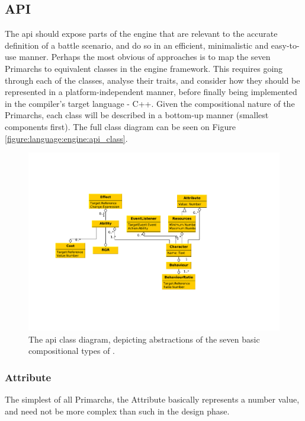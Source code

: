 \subsection*{API}

The \ac{api} should expose parts of the engine that are relevant to the accurate definition of a battle scenario, and do so in an efficient, minimalistic and easy-to-use manner. Perhaps the most obvious of approaches is to map the seven \langname{} Primarchs to equivalent classes in the engine framework. This requires going through each of the classes, analyse their traits, and consider how they should be represented in a platform-independent manner, before finally being implemented in the compiler's target language - C++. Given the compositional nature of the Primarchs, each class will be described in a bottom-up manner (smallest components first). The full class diagram can be seen on Figure \vref{figure:language:engine:api_class}.

\begin{figure}[!h]
\centering
\includegraphics[scale=.6, clip=true, trim=1cm 4cm 1cm 4cm]{img/class_diagram_api}
\caption{\label{figure:language:engine:api_class}The \ac{api} class diagram, depicting abstractions of the seven basic compositional types of \langname{}.}
\end{figure}

\subsubsection*{Attribute}
The simplest of all Primarchs, the Attribute basically represents a number value, and need not be more complex than such in the design phase.


